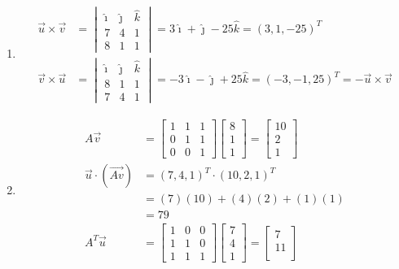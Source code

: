 \begin{Answer}
\begin{enumerate}[label=(\alph*)]
\item 
\begin{align*}
\vec{u} \times \vec{v} &= 
\begin{vmatrix}
\hat{\imath} & \hat{\jmath} & \hat{k}\\
7 & 4 & 1\\
8 & 1 & 1    
\end{vmatrix}
= 3\hat{\imath} + \hat{\jmath} - 25\hat{k} = (3, 1, -25)^T \\
\vec{v} \times \vec{u} &=
\begin{vmatrix}
\hat{\imath} & \hat{\jmath} & \hat{k}\\
8 & 1 & 1 \\  
7 & 4 & 1
\end{vmatrix}
= -3\hat{\imath} - \hat{\jmath} + 25\hat{k} = (-3, -1, 25)^T = -\vec{u} \times \vec{v}
\end{align*} 
\item 
\begin{align*}
A\vec{v} &= 
\begin{bmatrix}
1 & 1 & 1\\
0 & 1 & 1\\
0 & 0 & 1
\end{bmatrix}
\begin{bmatrix}
8 \\
1 \\
1
\end{bmatrix}
=
\begin{bmatrix}
10 \\
2 \\
1
\end{bmatrix} \\
\vec{u} \cdot (\vec{Av}) 
&= (7, 4, 1)^T \cdot (10, 2, 1)^T \\
&= (7)(10) + (4)(2) + (1)(1) \\
&= 79 \\
A^T\vec{u} &= 
\begin{bmatrix}
1 & 0 & 0\\
1 & 1 & 0\\
1 & 1 & 1
\end{bmatrix}
\begin{bmatrix}
7 \\ 
4 \\
1
\end{bmatrix}
=
\begin{bmatrix}
7 \\
11 \\

\end{bmatrix}
\end{align*}
\end{enumerate}
\end{Answer}

